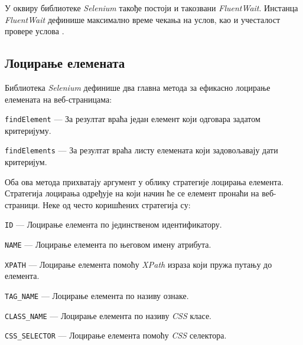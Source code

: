 \documentclass[12pt,oneside]{memoir}
\begin{document}
У оквиру библиотеке \textit{Selenium} такође постоји и такозвани \textit{FluentWait}. Инстанца \textit{FluentWait} дефинише максимално време чекања на услов, као и учесталост провере услова \cite{selenium}.

\subsection{Лоцирање елемената}
Библиотека \textit{Selenium} дефинише два главна метода за ефикасно лоцирање елемената на веб-страницама:
\begin{description} 
    \item \texttt{findElement} --- За резултат враћа један елемент који одговара задатом критеријуму.
    \item \texttt{findElements} --- За резултат враћа листу елемената који задовољавају дати критеријум.
\end{description}

Оба ова метода прихватају аргумент у облику стратегије лоцирања елемента. Стратегија лоцирања одређује на који начин ће се елемент пронаћи на веб-страници. Неке од често коришћених стратегија су: 
\begin{description} 
    \item \texttt{ID} --- Лоцирање елемента по јединственом идентификатору.
    \item \texttt{NAME} --- Лоцирање елемента по његовом имену атрибута.
    \item \texttt{XPATH} --- Лоцирање елемента помоћу \textit{XPath} израза који пружа путању до елемента.
    \item \texttt{TAG\_NAME} --- Лоцирање елемента по називу ознаке.
    \item \texttt{CLASS\_NAME} --- Лоцирање елемента по називу \textit{CSS} класе.
    \item \texttt{CSS\_SELECTOR} --- Лоцирање елемента помоћу \textit{CSS} селектора.
\end{description}
\end{document}
